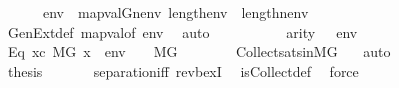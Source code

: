 \begin{isabellebody}
\ \ \ \ \ \ {\isachardoublequoteopen}env\ {\isacharequal}{\kern0pt}\ map{\isacharparenleft}{\kern0pt}val{\isacharparenleft}{\kern0pt}G{\isacharparenright}{\kern0pt}{\isacharcomma}{\kern0pt}nenv{\isacharparenright}{\kern0pt}{\isachardoublequoteclose}\ {\isachardoublequoteopen}length{\isacharparenleft}{\kern0pt}env{\isacharparenright}{\kern0pt}\ {\isacharequal}{\kern0pt}\ length{\isacharparenleft}{\kern0pt}nenv{\isacharparenright}{\kern0pt}{\isachardoublequoteclose}\isanewline
\ \ \ \ \ \ \isamarkupfalse%
\ GenExt{\isacharunderscore}{\kern0pt}def\ map{\isacharunderscore}{\kern0pt}val{\isacharbrackleft}{\kern0pt}of\ env{\isacharbrackright}{\kern0pt}\ \isamarkupfalse%
\ auto\isanewline
\ \ \ \ \isamarkupfalse%
\ \isamarkupfalse%
\ {\isacartoucheopen}{\isasymphi}\ {\isasymin}\ {\isacharunderscore}{\kern0pt}{\isacartoucheclose}\ {\isacartoucheopen}arity{\isacharparenleft}{\kern0pt}{\isasymphi}{\isacharparenright}{\kern0pt}\ {\isasymle}\ {\isacharunderscore}{\kern0pt}{\isacartoucheclose}\ {\isacartoucheopen}env\ {\isasymin}\ {\isacharunderscore}{\kern0pt}{\isacartoucheclose}\isanewline
\ \ \ \ \isamarkupfalse%
\isanewline
\ \ \ \ \isamarkupfalse%
\ Eq{}{\isacharcolon}{\kern0pt}\ {\isachardoublequoteopen}{\isacharbraceleft}{\kern0pt}x{\isasymin}c{\isachardot}{\kern0pt}\ {\isacharparenleft}{\kern0pt}M{\isacharbrackleft}{\kern0pt}G{\isacharbrackright}{\kern0pt}{\isacharcomma}{\kern0pt}\ {\isacharbrackleft}{\kern0pt}x{\isacharbrackright}{\kern0pt}\ {\isacharat}{\kern0pt}\ env\ {\isasymTurnstile}\ {\isasymphi}{\isacharparenright}{\kern0pt}{\isacharbraceright}{\kern0pt}\ {\isasymin}\ M{\isacharbrackleft}{\kern0pt}G{\isacharbrackright}{\kern0pt}{\isachardoublequoteclose}\isanewline
\ \ \ \ \ \ \isamarkupfalse%
\ Collect{\isacharunderscore}{\kern0pt}sats{\isacharunderscore}{\kern0pt}in{\isacharunderscore}{\kern0pt}MG\ \ \isamarkupfalse%
\ auto\isanewline
\ \ \isacommand{{\isacharbraceright}{\kern0pt}}\isamarkupfalse%
\isanewline
\ \ \isamarkupfalse%
\ \isanewline
\ \ \isamarkupfalse%
\ {\isacharquery}{\kern0pt}thesis\ \isanewline
\ \ \ \ \isamarkupfalse%
\ separation{\isacharunderscore}{\kern0pt}iff\ rev{\isacharunderscore}{\kern0pt}bexI\ \isamarkupfalse%
\ is{\isacharunderscore}{\kern0pt}Collect{\isacharunderscore}{\kern0pt}def\ \isamarkupfalse%
\ force\isanewline
{}\isamarkupfalse%
%
\endisatagproof
{\isafoldproof}%
%
\isadelimproof
\isanewline
%
\endisadelimproof
\isanewline
{}\isamarkupfalse%
\ \isanewline
%
\isadelimtheory
\isanewline
%
\endisadelimtheory
%
\isatagtheory
{}\isamarkupfalse%
%
\endisatagtheory
{\isafoldtheory}%
%
\isadelimtheory
%
\endisadelimtheory
%
\end{isabellebody}%
